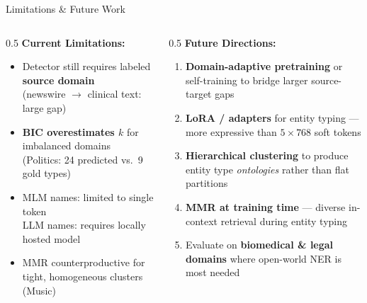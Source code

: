 \documentclass[aspectratio=169,10pt]{beamer}
\begin{document}
\begin{frame}{Limitations \& Future Work}
  \begin{columns}[T]
    \begin{column}{0.5\textwidth}
      \textbf{Current Limitations:}
      \vspace{0.3em}
      \begin{itemize}
        \setlength{\itemsep}{0.4em}
        \item Detector still requires labeled \textbf{source domain}\\
          (newswire $\to$ clinical text: large gap)
        \item \textbf{BIC overestimates $k$} for imbalanced domains\\
          (Politics: 24 predicted vs.\ 9 gold types)
        \item MLM names: limited to single token\\
          LLM names: requires locally hosted model
        \item MMR counterproductive for tight, homogeneous clusters (Music)
      \end{itemize}
    \end{column}
    \begin{column}{0.5\textwidth}
      \textbf{Future Directions:}
      \vspace{0.3em}
      \begin{enumerate}
        \setlength{\itemsep}{0.4em}
        \item \textbf{Domain-adaptive pretraining} or self-training to bridge larger source-target gaps
        \item \textbf{LoRA / adapters} for entity typing — more expressive than $5\times768$ soft tokens
        \item \textbf{Hierarchical clustering} to produce entity type \emph{ontologies} rather than flat partitions
        \item \textbf{MMR at training time} — diverse in-context retrieval during entity typing
        \item Evaluate on \textbf{biomedical \& legal domains} where open-world NER is most needed
      \end{enumerate}
    \end{column}
  \end{columns}
  \vspace{0.4em}
\end{frame}
\end{document}

